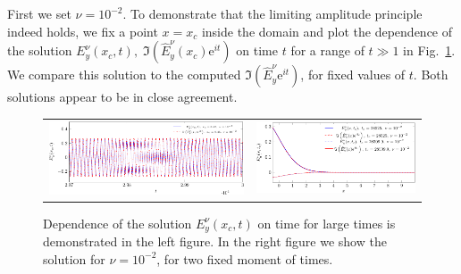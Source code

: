 First we set $\nu=10^{-2}$. To demonstrate that the limiting amplitude principle indeed holds, we fix a point $x=x_c$ 
inside the domain and plot the dependence of the solution $E_{y}^{\nu}(x_c,t), \; \Im\left(\hat{E}_y^{\nu}(x_c)\mathrm{e}^{it}\right)$ 
on time $t$ for a range of $t\gg 1$ in Fig.~\ref{fig:nu1e2_harmon}. We compare this solution to the computed $\Im\left(\hat{E}_y^{\nu}\mathrm{e}^{it}\right)$, for
fixed values of $t$. Both solutions appear to be in close agreement. 

\begin{figure}[htb]
\begin{tabular}{cc}
\includegraphics[height=0.2\textwidth]{pics_time_domain/airy/figure_nu1e2-crop.pdf} & \includegraphics[height=0.2\textwidth]{pics_time_domain/airy/figure_nu1e2_2-crop.pdf}
\end{tabular}
\caption{Dependence of the solution $E_{y}^{\nu}(x_c,t)$ on time for large times is demonstrated in the left figure.  
In the right figure we show the solution for $\nu=10^{-2}$, for two fixed moment of times.}
 \label{fig:nu1e2_harmon}
\end{figure}



